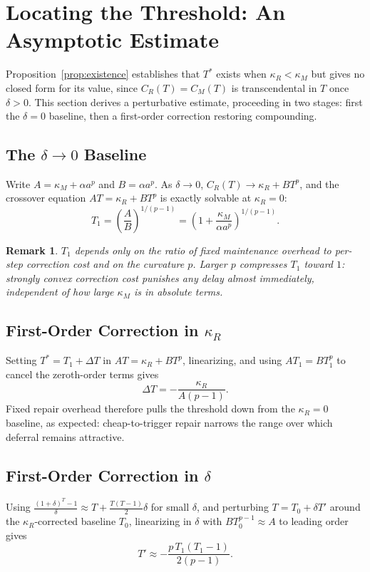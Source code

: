 \documentclass[11pt]{article}
\newtheorem*{remark}{Remark}
\begin{document}
\section{Locating the Threshold: An Asymptotic Estimate}

Proposition~\ref{prop:existence} establishes that $T^*$ exists when $\kappa_R < \kappa_M$ but gives no closed form for its value, since $C_R(T) = C_M(T)$ is transcendental in $T$ once $\delta > 0$. This section derives a perturbative estimate, proceeding in two stages: first the $\delta = 0$ baseline, then a first-order correction restoring compounding.

\subsection{The $\delta \to 0$ Baseline}

Write $A = \kappa_M + \alpha a^p$ and $B = \alpha a^p$. As $\delta \to 0$, $C_R(T) \to \kappa_R + BT^p$, and the crossover equation $AT = \kappa_R + BT^p$ is exactly solvable at $\kappa_R = 0$:
\[
T_1 = \left(\frac{A}{B}\right)^{1/(p-1)} = \left(1 + \frac{\kappa_M}{\alpha a^p}\right)^{1/(p-1)}.
\]

\begin{remark}
$T_1$ depends only on the ratio of fixed maintenance overhead to per-step correction cost and on the curvature $p$. Larger $p$ compresses $T_1$ toward $1$: strongly convex correction cost punishes any delay almost immediately, independent of how large $\kappa_M$ is in absolute terms.
\end{remark}

\subsection{First-Order Correction in $\kappa_R$}

Setting $T^* = T_1 + \Delta T$ in $AT = \kappa_R + BT^p$, linearizing, and using $AT_1 = BT_1^p$ to cancel the zeroth-order terms gives
\[
\Delta T = -\frac{\kappa_R}{A(p-1)}.
\]
Fixed repair overhead therefore pulls the threshold down from the $\kappa_R = 0$ baseline, as expected: cheap-to-trigger repair narrows the range over which deferral remains attractive.

\subsection{First-Order Correction in $\delta$}

Using $\frac{(1+\delta)^T - 1}{\delta} \approx T + \frac{T(T-1)}{2}\delta$ for small $\delta$, and perturbing $T = T_0 + \delta T'$ around the $\kappa_R$-corrected baseline $T_0$, linearizing in $\delta$ with $BT_0^{p-1} \approx A$ to leading order gives
\[
T' \approx -\frac{p\,T_1(T_1 - 1)}{2(p-1)}.
\]
\end{document}
